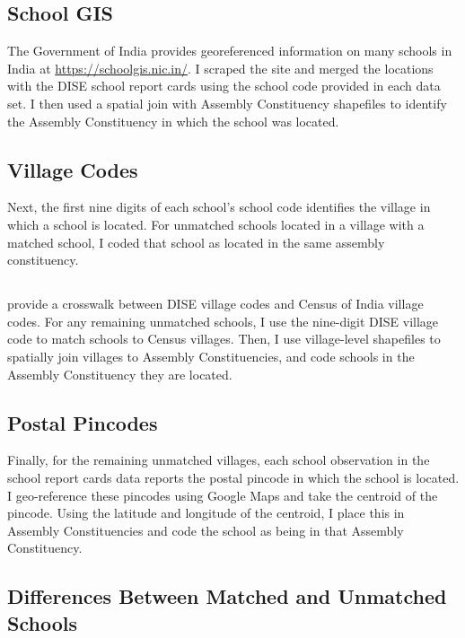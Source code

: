 \documentclass[hidelinks, 12pt, article, oneside]{memoir}
\begin{document}
\subsection{School GIS}

The Government of India provides georeferenced information on many schools in India at \url{https://schoolgis.nic.in/}. I scraped the site and merged the locations with the DISE school report cards using the school code provided in each data set.  I then used a spatial join with Assembly Constituency shapefiles to identify the Assembly Constituency in which the school was located.

\subsection{Village Codes}

Next, the first nine digits of each school's school code identifies the village in which a school is located.  For unmatched schools located in a village with a matched school, I coded that school as located in the same assembly constituency.

\subsection{\cite{Adukia2019b}}

\cite{Adukia2019b} provide a crosswalk between DISE village codes and Census of India village codes.  For any remaining unmatched schools, I use the nine-digit DISE village code to match schools to Census villages.  Then, I use village-level shapefiles to spatially join villages to Assembly Constituencies, and code schools in the Assembly Constituency they are located.

\subsection{Postal Pincodes}

Finally, for the remaining unmatched villages, each school observation in the school report cards data reports the postal pincode in which the school is located.  I geo-reference these pincodes using Google Maps and take the centroid of the pincode.  Using the latitude and longitude of the centroid, I place this in Assembly Constituencies and code the school as being in that Assembly Constituency.

\subsection{Differences Between Matched and Unmatched Schools}
\end{document}
